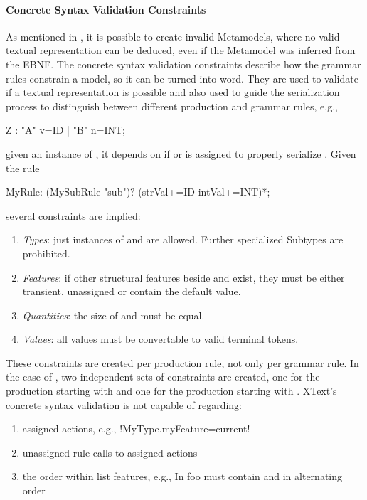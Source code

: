 \paragraph{Concrete Syntax Validation Constraints} \label{para:xtextVal}
As mentioned in \cite{MofCfg}, it is possible to create invalid Metamodels, where no valid textual representation can be deduced, even if the Metamodel was inferred from the EBNF. The concrete syntax validation constraints describe how the grammar rules constrain a model, so it can be turned into word. They are used to validate if a textual representation is possible and also used to guide the serialization process to distinguish between different production and grammar rules, e.g.,
\begin{xtxt}
Z 	:  "A" v=ID  
	|  "B" n=INT;
\end{xtxt}
given an instance of , it depends on if  or  is assigned to properly serialize .
Given the rule
\begin{xtxt}
MyRule:	({MySubRule} "sub")? (strVal+=ID intVal+=INT)*;
\end{xtxt}
several constraints are implied:
\begin{enumerate}
	\item \emph{Types}: just instances of  and  are allowed. Further specialized Subtypes are prohibited. 
	\item \emph{Features}: if other structural features beside  and  exist, they must be either transient, unassigned or contain the default value.
	\item \emph{Quantities}: the size of  and  must be equal.
	\item \emph{Values}: all values must be convertable to valid terminal tokens.
\end{enumerate}
These constraints are created per production rule, not only per grammar rule. In the case of , two independent sets of constraints are created, one for the production starting with  and one for the production starting with .
XText's concrete syntax validation is not capable of regarding:
\begin{enumerate}
	\item assigned actions, e.g., 
	\kode!{MyType.myFeature=current}!
	\item unassigned rule calls to assigned actions
	\item the order within list features, e.g., In  foo must contain  and  in alternating order
\end{enumerate}


